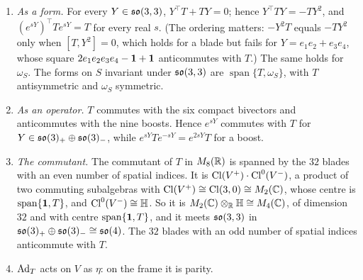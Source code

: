 \begin{proposition}
\label{e6:prop:Tform}
\begin{enumerate}[label=(\roman*),leftmargin=2.2em]
\item \emph{As a form.} For every $Y\in\mathfrak{so}(3,3)$, $Y^{\!\top}T+TY=0$; hence $Y^{\!\top}TY=-TY^2$, and $(e^{sY})^{\!\top}Te^{sY}=T$ for every real $s$. (The
ordering matters: $-Y^2T$ equals $-TY^2$ only when $[T,Y^2]=0$, which holds for a blade but fails for $Y=e_1e_2+e_3e_4$, whose square
$2e_1e_2e_3e_4-\mathbf 1+\mathbf 1$ anticommutes with $T$.) The same holds for
$\omega_S$. The forms on $S$ invariant under $\mathfrak{so}(3,3)$ are $\operatorname{span}\{T,\omega_S\}$, with $T$ antisymmetric and $\omega_S$ symmetric.
\item \emph{As an operator.} $T$ commutes with the six compact bivectors and anticommutes with the nine boosts. Hence $e^{sY}$ commutes with $T$ for
$Y\in\mathfrak{so}(3)_+\oplus\mathfrak{so}(3)_-$, while $e^{sY}Te^{-sY}=e^{2sY}T$ for a boost.
\item \emph{The commutant.} The commutant of $T$ in $M_8(\mathbb{R})$ is spanned by the $32$ blades with an even number of spatial indices. It is
$\mathrm{Cl}(V^+)\cdot\mathrm{Cl}^0(V^-)$, a product of two commuting subalgebras with $\mathrm{Cl}(V^+)\cong\mathrm{Cl}(3,0)\cong M_2(\mathbb{C})$, whose centre is $\operatorname{span}\{\mathbf 1,T\}$, and
$\mathrm{Cl}^0(V^-)\cong\mathbb{H}$. So it is $M_2(\mathbb{C})\otimes_{\mathbb{R}}\mathbb{H}\cong M_4(\mathbb{C})$, of dimension $32$ and with centre $\operatorname{span}\{\mathbf 1,T\}$, and it meets $\mathfrak{so}(3,3)$ in
$\mathfrak{so}(3)_+\oplus\mathfrak{so}(3)_-\cong\mathfrak{so}(4)$. The $32$ blades with an odd number of spatial indices anticommute with $T$.
\item $\operatorname{Ad}_T$ acts on $V$ as $\eta$: on the frame it is parity.
\end{enumerate}
\end{proposition}

